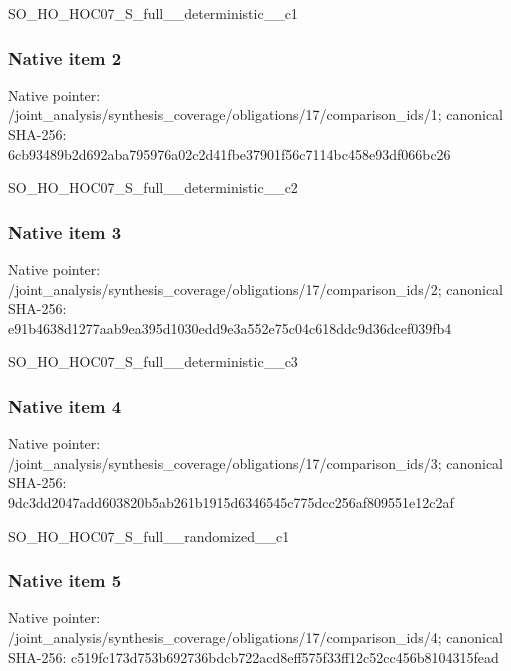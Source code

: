 \documentclass[10pt,a4paper]{article}
\begin{document}
\begingroup\raggedright\sloppy SO\_\allowbreak{}HO\_\allowbreak{}HOC07\_\allowbreak{}S\_\allowbreak{}full\_\allowbreak{}\_\allowbreak{}deterministic\_\allowbreak{}\_\allowbreak{}c1\par\endgroup

\subsubsection{Native item 2}
Native pointer: /joint\_\allowbreak{}analysis/synthesis\_\allowbreak{}coverage/obligations/17/comparison\_\allowbreak{}ids/1; canonical SHA-256: 6cb93489b2d692aba795976a02c2d41fbe37901f56c7114bc458e93df066bc26

\begingroup\raggedright\sloppy SO\_\allowbreak{}HO\_\allowbreak{}HOC07\_\allowbreak{}S\_\allowbreak{}full\_\allowbreak{}\_\allowbreak{}deterministic\_\allowbreak{}\_\allowbreak{}c2\par\endgroup

\subsubsection{Native item 3}
Native pointer: /joint\_\allowbreak{}analysis/synthesis\_\allowbreak{}coverage/obligations/17/comparison\_\allowbreak{}ids/2; canonical SHA-256: e91b4638d1277aab9ea395d1030edd9e3a552e75c04c618ddc9d36dcef039fb4

\begingroup\raggedright\sloppy SO\_\allowbreak{}HO\_\allowbreak{}HOC07\_\allowbreak{}S\_\allowbreak{}full\_\allowbreak{}\_\allowbreak{}deterministic\_\allowbreak{}\_\allowbreak{}c3\par\endgroup

\subsubsection{Native item 4}
Native pointer: /joint\_\allowbreak{}analysis/synthesis\_\allowbreak{}coverage/obligations/17/comparison\_\allowbreak{}ids/3; canonical SHA-256: 9dc3dd2047add603820b5ab261b1915d6346545c775dcc256af809551e12c2af

\begingroup\raggedright\sloppy SO\_\allowbreak{}HO\_\allowbreak{}HOC07\_\allowbreak{}S\_\allowbreak{}full\_\allowbreak{}\_\allowbreak{}randomized\_\allowbreak{}\_\allowbreak{}c1\par\endgroup

\subsubsection{Native item 5}
Native pointer: /joint\_\allowbreak{}analysis/synthesis\_\allowbreak{}coverage/obligations/17/comparison\_\allowbreak{}ids/4; canonical SHA-256: c519fc173d753b692736bdcb722acd8eff575f33ff12c52cc456b8104315fead
\end{document}
